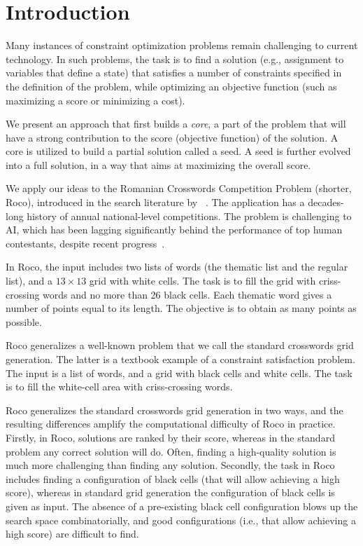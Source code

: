 \section{Introduction}
\label{sec::intro}

Many instances of constraint optimization problems
remain challenging to current technology.
In such problems, the task is to find a solution
(e.g., assignment to variables that define a state) 
that satisfies a number of constraints specified in the definition
of the problem, while optimizing an objective function
(such as maximizing a score or minimizing a cost).

We present an approach that first builds a \emph{core},
a part of the problem that will have a strong contribution
to the score (objective function) of the solution.
A core is utilized to build a partial solution called a seed.
A seed is further evolved into a full solution, in a way that aims
at maximizing the overall score.

We apply our ideas to the Romanian Crosswords Competition Problem (shorter, {\sc Roco}),
introduced in the search literature by
\citeauthor{DBLP:conf/socs/BoteaB21}~.
The application has a decades-long history of annual national-level competitions.
The problem is challenging to AI, which has been lagging significantly
behind the performance of top human contestants,
despite recent progress~\cite{DBLP:conf/socs/BoteaB21,DBLP:conf/cig/BulitkoB21,Botea_Bulitko_2022}.

In {\sc Roco}, the input includes two lists of words (the thematic list and the regular list),
and a $13 \times 13$ grid with white cells.
The task is to fill the grid with criss-crossing words and no more than 26 black cells.
Each thematic word gives a number of points equal to its length. The objective
is to obtain as many points as possible.

{\sc Roco} generalizes a well-known problem that we
call the {standard crosswords grid generation}.
The latter is a textbook example of a constraint satisfaction problem.
The input is a list of words, and a grid with black cells and white cells.
The task is to fill the white-cell area with criss-crossing words.

{\sc Roco} generalizes the standard crosswords grid generation in two ways,
and the resulting differences amplify the computational difficulty of {\sc Roco} in practice.
Firstly, in {\sc Roco}, solutions are ranked by their score,
whereas in the standard problem any correct solution will do.
Often, finding a high-quality solution is much more challenging than finding any solution.
Secondly, the task in {\sc Roco} includes finding a configuration of black cells
(that will allow achieving a high score), whereas in standard grid
generation the configuration of black cells is given as input.
The absence of a pre-existing black cell configuration
blows up the search space combinatorially, and good configurations
(i.e., that allow achieving a high score) are difficult to find.

